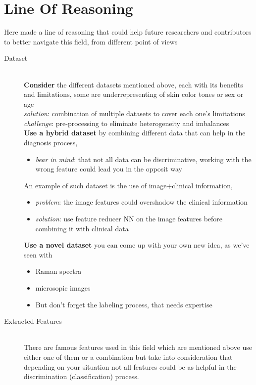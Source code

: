 \section{Line Of Reasoning}
    Here made a line of reasoning that could help future researchers and contributors to better navigate this field, from different point of views 
    \begin{description}
        \item[Dataset] \hfill \\
            \textbf{Consider} the different datasets mentioned above, each with its benefits and limitations, some are underrepresenting of skin color tones or sex or age \\
            \emph{solution}: combination of multiple datasets to cover each one's limitations \\
            \emph{challenge}: pre-processing to eliminate heterogeneity and imbalances \\

            \textbf{Use a hybrid dataset} by combining different data that can help in the diagnosis process, \\
            \begin{itemize}
                \item \emph{bear in mind}:  that not all data can be discriminative, working with the wrong feature could lead you in the opposit way 
            \end{itemize}
            An example of such dataset is the use of  image+clinical information, \\
            \begin{itemize}
                \item \emph{problem}: the image features could overshadow the clinical information \\
                \item \emph{solution}: use feature reducer NN on the image features before combining it with clinical data \\ 
            \end{itemize}
                
            \textbf{Use a novel dataset} you can come up with your own new idea, as we've seen with
                \begin{itemize}
                    \item Raman spectra
                    \item microsopic images
                    \item But don't forget the labeling process, that needs expertise
                \end{itemize}
        \item[Extracted Features] \hfill \\ 
            There are famous features used in this field which are mentioned above use either one of them or a combination but take into consideration that depending on your situation not all features could be as helpful in the discrimination (classification) process.
            

\end{description}
